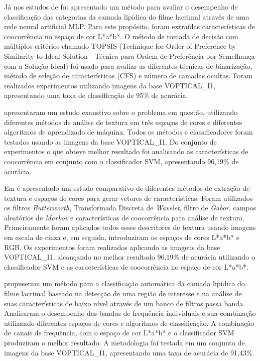 Já nos estudos de  foi apresentado um método para avaliar o desempenho de classificação das categorias da camada lipídica do filme lacrimal através de uma rede neural artificial MLP. Para este propósito, foram extraídas características de coocorrência no espaço de cor L*a*b*. O método de tomada de decisão com múltiplos critérios chamado TOPSIS (Technique for Order
of Preference by Similarity to Ideal Solution - Técnica para Ordem de Preferência por Semelhança com a Solução Ideal) foi usado para avaliar as diferentes técnicas de binarização, método de seleção de características (CFS) e número de camadas ocultas. Foram realizados experimentos utilizando imagens da base VOPTICAL\_I1, apresentando uma taxa de classificação de 95\% de acurácia.

 apresentaram um estudo exaustivo sobre o problema em questão, utilizando diferentes métodos de análise de textura em três espaços de cores e diferentes algoritmos de aprendizado de máquina. Todos os métodos e classificadores foram testados usando as imagens da base VOPTICAL\_I1. Do conjunto de experimentos o que obteve melhor resultado foi analisando as características de coocorrência em conjunto com o classificador SVM, apresentando 96,19\% de acurácia.

Em  é apresentado um estudo comparativo de diferentes métodos de extração de textura e espaços de cores para gerar vetores de características. Foram utilizados os filtros \textit{Butterworth}, Transformada Discreta de \textit{Wavelet}, filtro de \textit{Gabor}, campos aleatórios de \textit{Markov} e características de coocorrência para análise de textura. Primeiramente foram aplicados todos esses descritores de textura usando imagens em escala de cinza e, em seguida, introduziram os espaços de cores L*a*b* e RGB. Os experimentos foram realizados aplicando as imagens da base VOPTICAL\_I1, alcançando no melhor resultado 96,19\% de acurácia utilizando o classificador SVM e as características de coocorrência no espaço de cor L*a*b*.

 propuseram um método para a classificação automática da camada lipídica do filme lacrimal baseado na detecção de uma região de interesse e na análise de suas características de baixo nível através de um banco de filtros passa banda. Analisaram o desempenho das bandas de frequência individuais e sua combinação utilizando diferentes espaços de cores e algoritmos de classificação. A combinação de canais de frequência, com o espaço de cor L*a*b* e o classificador SVM produziram o melhor resultado. A metodologia foi testada em um conjunto de imagens da base VOPTICAL\_I1, apresentando uma taxa de acurácia de 91,43\%.

